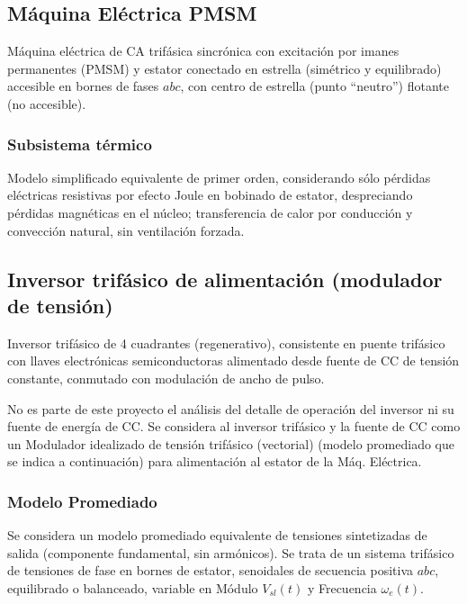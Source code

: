 \documentclass[a4paper, 10pt, onecolumn,journal]{ieeeconf}
\begin{document}
\subsection{\textbf{Máquina Eléctrica PMSM}}
Máquina eléctrica de CA trifásica sincrónica con excitación por imanes permanentes (PMSM) y estator conectado en estrella (simétrico y equilibrado) accesible en bornes de fases $abc$, con centro de estrella (punto “neutro”) flotante (no accesible).

\vspace*{0.2cm}
\subsubsection{\textbf{Subsistema térmico}} Modelo simplificado equivalente de primer orden, considerando sólo pérdidas
eléctricas resistivas por efecto Joule en bobinado de estator, despreciando pérdidas magnéticas
en el núcleo; transferencia de calor por conducción y convección natural, sin ventilación forzada.

\subsection{\textbf{Inversor trifásico de alimentación (modulador de tensión)}}

Inversor trifásico de 4 cuadrantes (regenerativo), consistente en puente trifásico con llaves electrónicas semiconductoras alimentado desde fuente de CC de tensión constante, conmutado con modulación de ancho de pulso.

No es parte de este proyecto el análisis del detalle de operación del inversor ni su fuente de energía de CC. Se considera al inversor trifásico y la fuente de CC como un Modulador idealizado de tensión trifásico (vectorial) (modelo promediado que se indica a continuación) para alimentación al estator de la Máq. Eléctrica.


\subsubsection{\textbf{Modelo Promediado}}
Se considera un modelo promediado equivalente de tensiones sintetizadas de salida (componente fundamental, sin armónicos). Se trata de un sistema trifásico de tensiones de fase en bornes de estator, senoidales de secuencia positiva $abc$, equilibrado o balanceado, variable en Módulo $V_{sl}(t)$ y Frecuencia $\omega_e(t)$.
\end{document}

